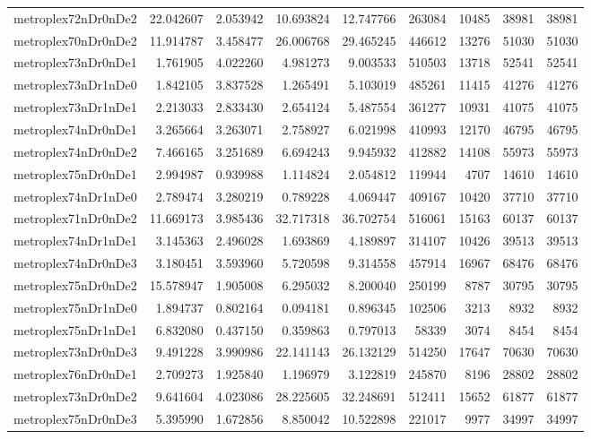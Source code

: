 \begin{longtable}{|l|r|r|r|r|r|r|r|r|}
metroplex72nDr0nDe2 & 22.042607 & 2.053942 & 10.693824 & 12.747766 & 263084 & 10485 & 38981 & 38981 \\
metroplex70nDr0nDe2 & 11.914787 & 3.458477 & 26.006768 & 29.465245 & 446612 & 13276 & 51030 & 51030 \\
metroplex73nDr0nDe1 & 1.761905 & 4.022260 & 4.981273 & 9.003533 & 510503 & 13718 & 52541 & 52541 \\
metroplex73nDr1nDe0 & 1.842105 & 3.837528 & 1.265491 & 5.103019 & 485261 & 11415 & 41276 & 41276 \\
metroplex73nDr1nDe1 & 2.213033 & 2.833430 & 2.654124 & 5.487554 & 361277 & 10931 & 41075 & 41075 \\
metroplex74nDr0nDe1 & 3.265664 & 3.263071 & 2.758927 & 6.021998 & 410993 & 12170 & 46795 & 46795 \\
metroplex74nDr0nDe2 & 7.466165 & 3.251689 & 6.694243 & 9.945932 & 412882 & 14108 & 55973 & 55973 \\
metroplex75nDr0nDe1 & 2.994987 & 0.939988 & 1.114824 & 2.054812 & 119944 & 4707 & 14610 & 14610 \\
metroplex74nDr1nDe0 & 2.789474 & 3.280219 & 0.789228 & 4.069447 & 409167 & 10420 & 37710 & 37710 \\
metroplex71nDr0nDe2 & 11.669173 & 3.985436 & 32.717318 & 36.702754 & 516061 & 15163 & 60137 & 60137 \\
metroplex74nDr1nDe1 & 3.145363 & 2.496028 & 1.693869 & 4.189897 & 314107 & 10426 & 39513 & 39513 \\
metroplex74nDr0nDe3 & 3.180451 & 3.593960 & 5.720598 & 9.314558 & 457914 & 16967 & 68476 & 68476 \\
metroplex75nDr0nDe2 & 15.578947 & 1.905008 & 6.295032 & 8.200040 & 250199 & 8787 & 30795 & 30795 \\
metroplex75nDr1nDe0 & 1.894737 & 0.802164 & 0.094181 & 0.896345 & 102506 & 3213 & 8932 & 8932 \\
metroplex75nDr1nDe1 & 6.832080 & 0.437150 & 0.359863 & 0.797013 & 58339 & 3074 & 8454 & 8454 \\
metroplex73nDr0nDe3 & 9.491228 & 3.990986 & 22.141143 & 26.132129 & 514250 & 17647 & 70630 & 70630 \\
metroplex76nDr0nDe1 & 2.709273 & 1.925840 & 1.196979 & 3.122819 & 245870 & 8196 & 28802 & 28802 \\
metroplex73nDr0nDe2 & 9.641604 & 4.023086 & 28.225605 & 32.248691 & 512411 & 15652 & 61877 & 61877 \\
metroplex75nDr0nDe3 & 5.395990 & 1.672856 & 8.850042 & 10.522898 & 221017 & 9977 & 34997 & 34997 \\

\end{longtable}

